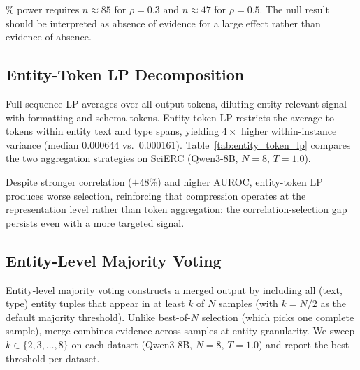 \% power requires $n{\approx}85$ for $\rho{=}0.3$ and $n{\approx}47$ for $\rho{=}0.5$. The null result should be interpreted as absence of evidence for a large effect rather than evidence of absence.

\subsection{Entity-Token LP Decomposition}\label{app:entity_token_lp}

Full-sequence LP averages over all output tokens, diluting entity-relevant signal with formatting and schema tokens.
Entity-token LP restricts the average to tokens within entity text and type spans, yielding $4{\times}$ higher within-instance variance (median 0.000644 vs.\ 0.000161).
Table~\ref{tab:entity_token_lp} compares the two aggregation strategies on SciERC (Qwen3-8B, $N{=}8$, $T{=}1.0$).

\begin{table}[h]
\centering
\small
\caption{Full-sequence vs.\ entity-token LP on SciERC NER (Qwen3-8B, $N{=}8$, $T{=}1.0$). Entity-token LP has higher variance and stronger correlation, yet selection degrades.}
\label{tab:entity_token_lp}
\end{table}

Despite stronger correlation ($+$48\%) and higher AUROC, entity-token LP produces worse selection, reinforcing that compression operates at the representation level rather than token aggregation: the correlation-selection gap persists even with a more targeted signal.

\subsection{Entity-Level Majority Voting}\label{app:entity_merge}

Entity-level majority voting constructs a merged output by including all (text, type) entity tuples that appear in at least $k$ of $N$ samples (with $k = N/2$ as the default majority threshold).
Unlike best-of-$N$ selection (which picks one complete sample), merge combines evidence across samples at entity granularity.
We sweep $k \in \{2, 3, \ldots, 8\}$ on each dataset (Qwen3-8B, $N{=}8$, $T{=}1.0$) and report the best threshold per dataset.

